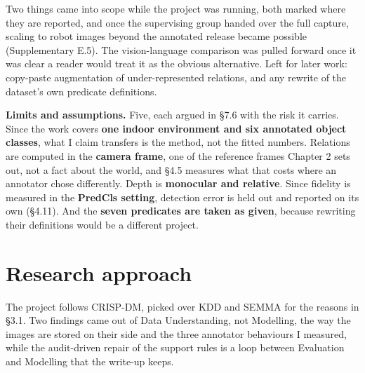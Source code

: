 Two things came into scope while the project was running, both marked where they are reported, and once the supervising group handed over the full capture, scaling to robot images beyond the annotated release became possible (Supplementary E.5). The vision-language comparison was pulled forward once it was clear a reader would treat it as the obvious alternative. Left for later work: copy-paste augmentation of under-represented relations, and any rewrite of the dataset's own predicate definitions.

\textbf{Limits and assumptions.} Five, each argued in \S{}7.6 with the risk it carries. Since the work covers \textbf{one indoor environment and six annotated object classes}, what I claim transfers is the method, not the fitted numbers. Relations are computed in the \textbf{camera frame}, one of the reference frames Chapter 2 sets out, not a fact about the world, and \S{}4.5 measures what that costs where an annotator chose differently. Depth is \textbf{monocular and relative}. Since fidelity is measured in the \textbf{PredCls setting}, detection error is held out and reported on its own (\S{}4.11). And the \textbf{seven predicates are taken as given}, because rewriting their definitions would be a different project.

\section{Research approach}

The project follows CRISP-DM, picked over KDD and SEMMA for the reasons in \S{}3.1. Two findings came out of Data Understanding, not Modelling, the way the images are stored on their side and the three annotator behaviours I measured, while the audit-driven repair of the support rules is a loop between Evaluation and Modelling that the write-up keeps.

